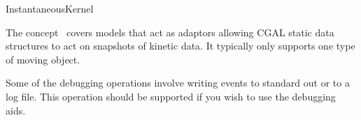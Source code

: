 

\begin{ccRefConcept}{InstantaneousKernel}


\ccDefinition
  
The concept \ccRefName\ covers models that act as adaptors allowing CGAL static data structures to act on snapshots of kinetic data. It typically only supports one type of moving object.

\ccTypes 



\ccOperations


Some of the debugging operations involve writing events to standard
out or to a log file. This operation should be supported if you wish
to use the debugging aids.

\ccHasModels






\end{ccRefConcept}


